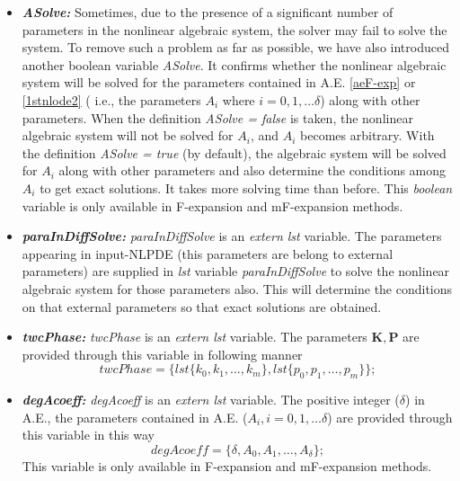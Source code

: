 \documentclass[prd,aps,floats,showkeys,nofootinbib,notitlepage]{revtex4-2}
\begin{document}
\begin{itemize}
		\item[] {\em \textbf{ASolve:}} Sometimes, due to the presence of a significant number of parameters in the nonlinear algebraic system, the solver may fail to solve the system. To remove such a problem as far as possible, we have also introduced another boolean variable {\em ASolve}. It confirms whether the nonlinear algebraic system will be solved for the parameters contained in A.E. \eqref{aeF-exp} or \eqref{1stnlode2} ( i.e., the parameters $A_i$ where $i=0,1,\ldots \delta$) along with other parameters. When the definition {\em ASolve = false} is taken, the nonlinear algebraic system will not be solved for $A_i$, and $A_i$ becomes arbitrary. With the definition {\em ASolve = true} (by default), the algebraic system will be solved for $A_i$ along with other parameters and also determine the conditions among $A_i$ to get exact solutions. It takes more solving time than before. This {\em boolean} variable is only available in F-expansion and mF-expansion methods. 
		
		\item[] {\em \textbf{paraInDiffSolve:}} {\em paraInDiffSolve} is an {\em extern lst} variable. The parameters appearing in input-NLPDE (this parameters are belong to external parameters) are supplied in {\em lst} variable {\em paraInDiffSolve} to solve the nonlinear algebraic system for those parameters also. This will determine the conditions on that external parameters so that exact solutions are obtained.
		
		\item[] {\em \textbf{twcPhase:}} {\em twcPhase} is an {\em extern lst} variable. The parameters $\boldsymbol{K}, \boldsymbol{P}$ are provided through this variable in following manner
		\begin{equation}
			twcPhase = \{lst\{k_0,k_1,\ldots,k_m\},lst\{p_0,p_1,\ldots,p_m\}\};
		\end{equation}
		\item[] {\em \textbf{degAcoeff:}} {\em degAcoeff} is an {\em extern lst} variable. The positive integer ($\delta$) in A.E., the parameters contained in A.E. ($A_i,i=0,1,\ldots\delta$) are provided through this variable in this way
		\begin{equation}
			degAcoeff=\{\delta,A_0,A_1,\ldots,A_\delta\};
		\end{equation}
		This variable is only available in F-expansion and mF-expansion methods.
		

\end{itemize}
\end{document}
